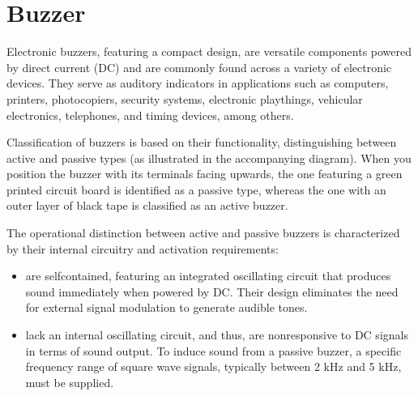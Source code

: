 \documentclass[a4paper,11pt,english]{sphinxmanual}
\begin{document}
\sphinxstepscope


\section{Buzzer}
\label{\detokenize{Components_Kit/component_buzzer:buzzer}}\label{\detokenize{Components_Kit/component_buzzer:cpn-buzzer}}\label{\detokenize{Components_Kit/component_buzzer::doc}}

\sphinxAtStartPar
Electronic buzzers, featuring a compact design, are versatile components powered by direct current (DC) and are commonly found across a variety of electronic devices. They serve as auditory indicators in applications such as computers, printers, photocopiers, security systems, electronic playthings, vehicular electronics, telephones, and timing devices, among others.

\sphinxAtStartPar
Classification of buzzers is based on their functionality, distinguishing between active and passive types (as illustrated in the accompanying diagram). When you position the buzzer with its terminals facing upwards, the one featuring a green printed circuit board is identified as a passive type, whereas the one with an outer layer of black tape is classified as an active buzzer.


\sphinxAtStartPar
The operational distinction between active and passive buzzers is characterized by their internal circuitry and activation requirements:
\begin{itemize}
\item {} 
\sphinxAtStartPar
{} are self\sphinxhyphen{}contained, featuring an integrated oscillating circuit that produces sound immediately when powered by DC. Their design eliminates the need for external signal modulation to generate audible tones.

\item {} 
\sphinxAtStartPar
{} lack an internal oscillating circuit, and thus, are non\sphinxhyphen{}responsive to DC signals in terms of sound output. To induce sound from a passive buzzer, a specific frequency range of square wave signals, typically between 2 kHz and 5 kHz, must be supplied.

\end{itemize}
\end{document}

